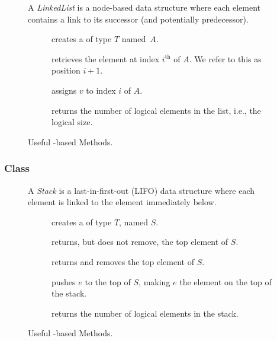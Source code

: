 \begin{figure}[tp]
  \small
  \begin{tcolorbox}[title=Java Linked Lists]
    A \emph{LinkedList} is a node-based data structure where each element contains a link to its successor (and potentially predecessor).
    \vspace{2ex}
  \begin{description}
    \item [] creates a  of type $T$ named~$A$.
    \item [] retrieves the element at index $i^{\text{th}}$ of $A$. We refer to this as position $i + 1$. 
    \item [] assigns $v$ to index $i$ of $A$.
    \item [] returns the number of logical elements in the list, i.e., the logical size.
  \end{description}
\end{tcolorbox}
  \caption{Useful -based Methods.}
  \label{fig:linkedlists}
\end{figure}

\subsubsection*{ Class}
\begin{figure}[tp]
  \small
  \begin{tcolorbox}[title=Java Stacks]
    A \emph{Stack} is a last-in-first-out (LIFO) data structure where each element is linked to the element immediately below. 
    \vspace{2ex}
  \begin{description}
    \item [] creates a  of type $T$, named $S$.
    \item [] returns, but does not remove, the top element of $S$.
    \item [] returns and removes the top element of $S$.
    \item [] pushes $e$ to the top of $S$, making $e$ the element on the top of the stack.
    \item [] returns the number of logical elements in the stack.
  \end{description}
\end{tcolorbox}
  \caption{Useful -based Methods.}
  \label{fig:stacks}
\end{figure}

